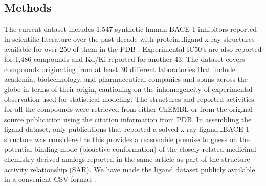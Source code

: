 \subsection{Methods}

The current dataset includes 1,547 synthetic human BACE-1 inhibitors reported in scientific literature over the past decade with protein…ligand x-ray structures available for over 250 of them in the PDB \cite{rose2010rcsb}.  Experimental IC50’s are also reported for 1,486 compounds and Kd/Ki reported for another 43.  The dataset covers compounds originating from at least 30 different laboratories that include academia, biotechnology, and pharmaceutical companies and spans across the globe in terms of their origin, cautioning on the inhomogeneity of experimental observation \cite{kramer2016comprehensive} used for statistical modeling.  The structures and reported activities for all the compounds were retrieved from either ChEMBL \cite{gaulton2011chembl} or from the original source publication using the citation information from PDB.  In assembling the ligand dataset, only publications that reported a solved x-ray ligand…BACE-1 structure was considered as this provides a reasonable premise to guess on the potential binding mode (bioactive conformation) of the closely related medicinal chemistry derived analogs reported in the same article as part of the structure-activity relationship (SAR).  We have made the ligand dataset publicly available in a convenient CSV format \cite{wu2017moleculenet}.

